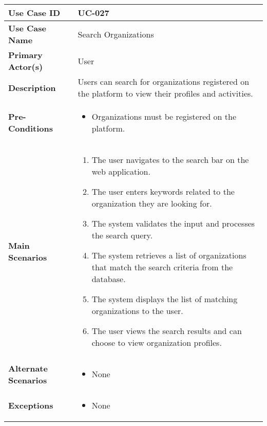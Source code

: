 \begin{table}[!ht]
    \centering
    \renewcommand{\arraystretch}{1.3} %
    \begin{tabularx}{\textwidth}{|l|X|}
        \hline
        \textbf{Use Case ID} & UC-027 \\
        \hline
        \textbf{Use Case Name} & Search Organizations \\
        \hline
        \textbf{Primary Actor(s)} & User \\
        \hline
        \textbf{Description} & Users can search for organizations registered on the platform to view their profiles and activities. \\
        \hline
        \textbf{Pre-Conditions} & 
        \begin{itemize}[label=--,itemsep=0pt]
            \item Organizations must be registered on the platform.
        \end{itemize} \\
        \hline
        \textbf{Main Scenarios} & 
        \begin{enumerate}[label=\arabic*.,itemsep=0pt]
            \item The user navigates to the search bar on the web application.
            \item The user enters keywords related to the organization they are looking for.
            \item The system validates the input and processes the search query.
            \item The system retrieves a list of organizations that match the search criteria from the database.
            \item The system displays the list of matching organizations to the user.
            \item The user views the search results and can choose to view organization profiles.
        \end{enumerate} \\
        \hline
        \textbf{Alternate Scenarios} & 
        \begin{itemize}[label=--,itemsep=0pt]
            \item None
        \end{itemize} \\
        \hline
        \textbf{Exceptions} & 
        \begin{itemize}[label=--,itemsep=0pt]
            \item None

\end{itemize}
\end{tabularx}
\end{table}
